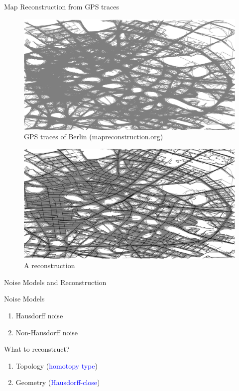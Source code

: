 \documentclass[9pt,sans-serif]{beamer}
\begin{document}
\begin{frame}{Map Reconstruction from GPS traces}
  \begin{figure}[htb]
    \centering \includegraphics[scale=0.15]{Berlin}
    \caption{GPS traces of Berlin (mapreconstruction.org)}
  \end{figure}
  
  \pause
  \begin{figure}[htb]
    \centering \includegraphics[scale=0.2]{Berlin_Recon}
    \caption{A reconstruction}
  \end{figure}
\end{frame}

\begin{frame}{Noise Models and Reconstruction}
  \begin{block}{Noise Models}
    \begin{enumerate}
    \item Hausdorff noise
      \pause
    \item Non-Hausdorff noise
    \end{enumerate}
  \end{block}
  
  \pause
  
  \begin{block}{What to reconstruct?}
    \begin{enumerate}
    \item Topology
      (\textcolor{blue}{homotopy type})
      \pause
    \item Geometry
      (\textcolor{blue}{Hausdorff-close})
      \pause
    \end{enumerate}
  \end{block}
\end{frame}
\end{document}
